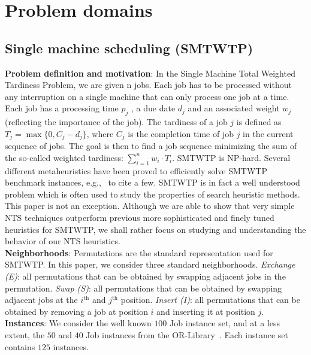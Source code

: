 \documentclass{acm_proc_article-sp}
\begin{document}
\section{Problem domains}\label{sec:prob}
\subsection{Single machine scheduling (SMTWTP)}
\textbf{Problem definition and motivation}: In the Single Machine Total Weighted Tardiness Problem, we are given n jobs. Each job has to be processed without any interruption on a single machine that can only process one job at a time. Each job has a processing time $p_j$ , a due date $d_j$ and an associated weight $w_j$ (reflecting the importance of the job). The tardiness of a job $j$ is defined as $T_j = \max \{0, C_j - d_j \}$, where $C_j$ is the completion time of job $j$ in the current sequence of jobs. The goal is then to find a job sequence minimizing the sum of the so-called weighted tardiness: $\sum_{i=1}^{n} w_i \cdot T_i$. SMTWTP is NP-hard. Several different metaheuristics have been proved to efficiently solve SMTWTP benchmark instances, e.g.,~\cite{vnd,ILS,dyna} to cite a few. SMTWTP is in fact a well understood problem which is often used to study the properties of search heuristic methods. This paper is not an exception. Although we are able to show that very simple NTS techniques outperform previous more sophisticated and finely tuned heuristics for SMTWTP, we shall rather focus on studying and understanding the behavior of our NTS heuristics.\\
\textbf{Neighborhoods}: Permutations are the standard representation used for SMTWTP. In this paper, we consider three standard neighborhoods. \textit{Exchange (E)}: all permutations that can be obtained by swapping adjacent jobs in the permutation. \textit{Swap (S)}:  all permutations that can be obtained by swapping adjacent jobs at the $i^{\textrm{th}}$ and $j^{\textrm{th}}$ position. \textit{Insert (I)}: all permutations that can be obtained by removing a job at position $i$ and inserting it at position $j$.\\
\textbf{Instances}: We consider the well known $100$ Job instance set, and at a less extent, the $50$ and $40$ Job instances from the OR-Library~\cite{or}. Each instance set contains $125$ instances.
\end{document}
